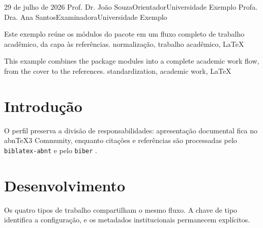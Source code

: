 \documentclass[12pt]{report}
\begin{document}
\ABNTEXacademicoexterna

\ABNTEXacademicopretextual
\ABNTEXfolhaderosto


\ABNTEXfolhadeaprovacao
  {29 de julho de 2026}
  {%
    \ABNTEXmembrobanca
      {Prof. Dr. João Souza}{Orientador}{Universidade Exemplo}
    \ABNTEXmembrobanca
      {Profa. Dra. Ana Santos}{Examinadora}{Universidade Exemplo}
  }

\ABNTEXresumo
  {Este exemplo reúne os módulos do pacote em um fluxo completo de trabalho
   acadêmico, da capa às referências.}
  {normalização, trabalho acadêmico, LaTeX}

\ABNTEXresumoemlinguaestrangeira
  {This example combines the package modules into a complete academic work
   flow, from the cover to the references.}
  {standardization, academic work, LaTeX}

\ABNTEXsumario

\ABNTEXacademicotextual

\chapter{Introdução}

O perfil preserva a divisão de responsabilidades: apresentação documental
fica no abnTeX3 Community, enquanto citações e referências são processadas
pelo \texttt{biblatex-abnt} e pelo \texttt{biber}
\parencite{associacao2025}.

\chapter{Desenvolvimento}

Os quatro tipos de trabalho compartilham o mesmo fluxo. A chave de tipo
identifica a configuração, e os metadados institucionais permanecem
explícitos.

\ABNTEXacademicopostextual
\ABNTEXbibliografia
\end{document}
